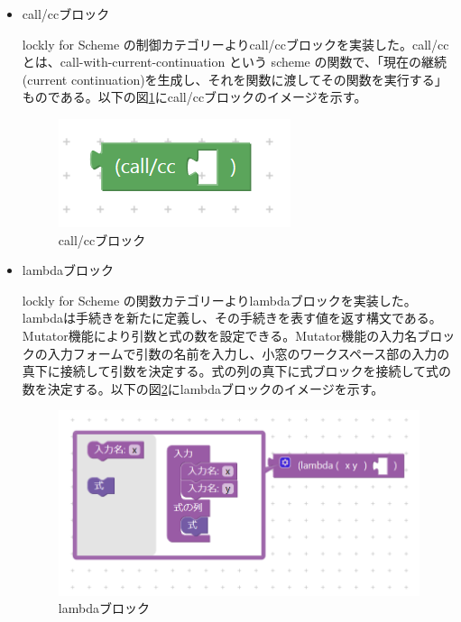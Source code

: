 \documentclass{risepaper}
\begin{document}
\begin{itemize}
\item call/ccブロック

lockly for Scheme の制御カテゴリーよりcall/ccブロックを実装した。call/ccとは、call-with-current-continuation という scheme の関数で、「現在の継続(current continuation)を生成し、それを関数に渡してその関数を実行する」ものである。以下の図\ref{fig:scheme_callcc}にcall/ccブロックのイメージを示す。

\begin{figure}[h]
\begin{center}
\includegraphics[scale=0.8]{img/scheme_callcc.PNG}
\caption{call/ccブロック}%
\label{fig:scheme_callcc}
\end{center}%
\end{figure}%

\item lambdaブロック

lockly for Scheme の関数カテゴリーよりlambdaブロックを実装した。lambdaは手続きを新たに定義し、その手続きを表す値を返す構文である。Mutator機能により引数と式の数を設定できる。Mutator機能の入力名ブロックの入力フォームで引数の名前を入力し、小窓のワークスペース部の入力の真下に接続して引数を決定する。式の列の真下に式ブロックを接続して式の数を決定する。以下の図\ref{fig:scheme_lambda}にlambdaブロックのイメージを示す。

\begin{figure}[h]
\begin{center}
\includegraphics[scale=0.8]{img/scheme_lambda.PNG}
\caption{lambdaブロック}%
\label{fig:scheme_lambda}
\end{center}%
\end{figure}%


\end{itemize}
\end{document}
